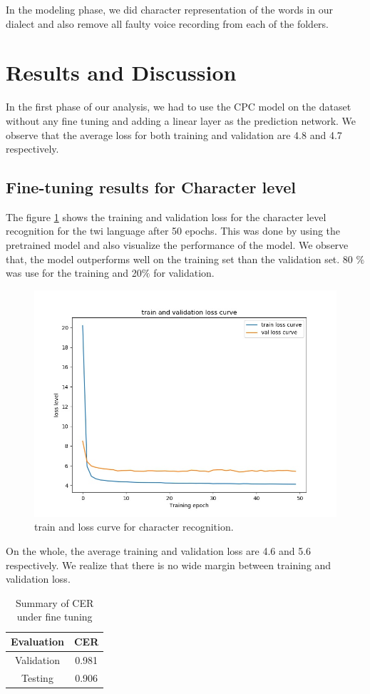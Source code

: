 \documentclass[10pt,a4paper]{article}
\begin{document}
In the modeling phase, we did character representation of the words in our dialect and also remove all faulty voice recording from each of the folders.  

\section{Results and Discussion}

In the first phase of our analysis, we had to use the CPC model on the dataset without any fine tuning and adding a linear layer as the prediction network. We observe that the average loss for both training and validation are 4.8 and 4.7 respectively. 

\subsection{Fine-tuning results for Character level}

The figure \ref{fig:trainloss} shows the training and validation loss for the character level recognition for the twi language after 50 epochs. This was done by using the pretrained model and also visualize the performance of the model. We observe that, the model outperforms well on the training set than the validation set. 80 $\%$ was use for the training and 20$\%$ for validation. 

\begin{figure}[h]
	\centering
	\includegraphics[width=0.6\linewidth]{../train_loss}
	\caption{train and loss curve for character recognition.}
	\label{fig:trainloss}
\end{figure}

On the whole, the average training and validation loss are 4.6 and 5.6 respectively. We realize that there is no wide margin between training and validation loss.  
\begin{table}[h!]
	\begin{center}
		\caption{Summary of CER under fine tuning}
		\label{tab1}
	 \begin{tabular}{|c|c|}
		\hline 
		Evaluation	& CER \\ 
		\hline 
		Validation	& 0.981 \\ 
		\hline  
		Testing &  0.906  \\ \hline
	\end{tabular} 
	\end{center}
\end{table}
\end{document}
